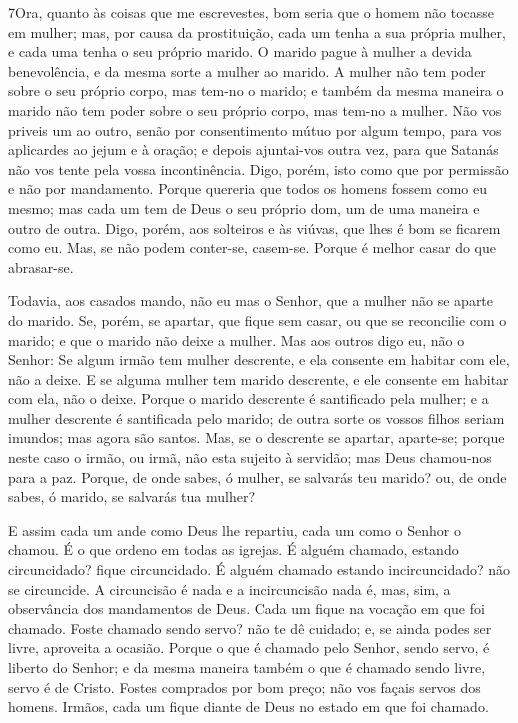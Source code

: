 \medskip

\lettrine{7} Ora, quanto às coisas que me escrevestes, bom
seria que o homem não tocasse em mulher; mas, por causa da
prostituição, cada um tenha a sua própria mulher, e cada uma tenha o
seu próprio marido. O marido pague à mulher a devida
benevolência, e da mesma sorte a mulher ao marido. A mulher não
tem poder sobre o seu próprio corpo, mas tem-no o marido; e também
da mesma maneira o marido não tem poder sobre o seu próprio corpo,
mas tem-no a mulher. Não vos priveis um ao outro, senão por
consentimento mútuo por algum tempo, para vos aplicardes ao jejum e
à oração; e depois ajuntai-vos outra vez, para que Satanás não vos
tente pela vossa incontinência. Digo, porém, isto como que por
permissão e não por mandamento. Porque quereria que todos os
homens fossem como eu mesmo; mas cada um tem de Deus o seu próprio
dom, um de uma maneira e outro de outra. Digo, porém, aos
solteiros e às viúvas, que lhes é bom se ficarem como eu. Mas,
se não podem conter-se, casem-se. Porque é melhor casar do que
abrasar-se.

Todavia, aos casados mando, não eu mas o Senhor, que a mulher não
se aparte do marido. Se, porém, se apartar, que fique sem
casar, ou que se reconcilie com o marido; e que o marido não deixe a
mulher. Mas aos outros digo eu, não o Senhor: Se algum irmão
tem mulher descrente, e ela consente em habitar com ele, não a
deixe. E se alguma mulher tem marido descrente, e ele
consente em habitar com ela, não o deixe. Porque o marido
descrente é santificado pela mulher; e a mulher descrente é
santificada pelo marido; de outra sorte os vossos filhos seriam
imundos; mas agora são santos. Mas, se o descrente se
apartar, aparte-se; porque neste caso o irmão, ou irmã, não esta
sujeito à servidão; mas Deus chamou-nos para a paz. Porque,
de onde sabes, ó mulher, se salvarás teu marido? ou, de onde sabes,
ó marido, se salvarás tua mulher?

E assim cada um ande como Deus lhe repartiu, cada um como o
Senhor o chamou. É o que ordeno em todas as igrejas. É alguém
chamado, estando circuncidado? fique circuncidado. É alguém chamado
estando incircuncidado? não se circuncide. A circuncisão é
nada e a incircuncisão nada é, mas, sim, a observância dos
mandamentos de Deus. Cada um fique na vocação em que foi
chamado. Foste chamado sendo servo? não te dê cuidado; e, se
ainda podes ser livre, aproveita a ocasião. Porque o que é
chamado pelo Senhor, sendo servo, é liberto do Senhor; e da mesma
maneira também o que é chamado sendo livre, servo é de Cristo.
Fostes comprados por bom preço; não vos façais servos dos
homens. Irmãos, cada um fique diante de Deus no estado em que
foi chamado.

